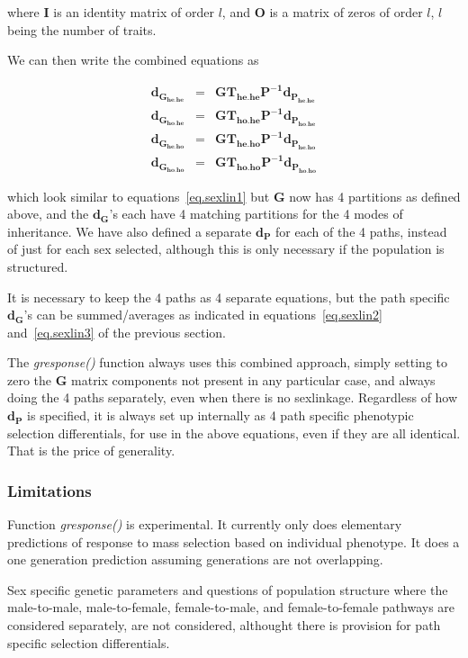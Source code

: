 \documentclass[titlepage]{article}  %
\begin{document}
where $\bm{I}$ is an identity matrix of order $l$, and $\bm{O}$ is a matrix of zeros of order $l$, $l$ being the number of traits.

We can then write the combined equations as

\begin{eqnarray}
\bm{d_{G_{he.he}}} & = & \bm{G T_{he.he} P^{-1} d_{P_{he.he}}} \nonumber \\
\bm{d_{G_{ho.he}}} & = & \bm{G T_{ho.he} P^{-1} d_{P_{ho.he}}} \nonumber \\
\bm{d_{G_{he.ho}}} & = & \bm{G T_{he.ho} P^{-1} d_{P_{he.ho}}} \nonumber \\
\bm{d_{G_{ho.ho}}} & = & \bm{G T_{ho.ho} P^{-1} d_{P_{ho.ho}}}
\end{eqnarray}

which look similar to equations~\ref{eq.sexlin1} but $\bm{G}$ now has 4 partitions as defined above, and the $\bm{d_{G}}$'s each have 4 matching partitions for the 4 modes of inheritance. We have also defined a separate $\bm{d_{P}}$ for each of the 4 paths, instead of just for each sex selected, although this is only necessary if the population is structured.

It is necessary to keep the 4 paths as 4 separate equations, but the path specific $\bm{d_{G}}$'s can be summed/averages as indicated in equations~\ref{eq.sexlin2} and~\ref{eq.sexlin3} of the previous section.

The {\em gresponse()} function always uses this combined approach, simply setting to zero the $\bm{G}$ matrix components not present in any particular case, and always doing the 4 paths separately, even when there is no sexlinkage. Regardless of how $\bm{d_{P}}$ is specified, it is always set up internally as 4 path specific phenotypic selection differentials, for use in the above equations, even if they are all identical. That is the price of generality.


\subsubsection{Limitations}
 Function {\em gresponse()} is experimental. It currently only does elementary predictions of response to mass selection based on individual phenotype. It does a one generation prediction assuming generations are not overlapping.

 Sex specific genetic parameters and questions of population structure where the male-to-male, male-to-female, female-to-male, and female-to-female pathways are considered separately, are not considered, althought there is provision for path specific selection differentials.
\end{document}
